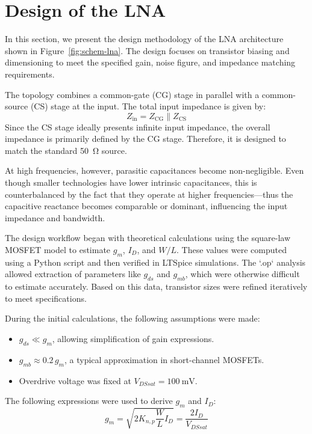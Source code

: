 \section{Design of the LNA}

In this section, we present the design methodology of the LNA architecture shown in Figure~\ref{fig:schem-lna}. The design focuses on transistor biasing and dimensioning to meet the specified gain, noise figure, and impedance matching requirements.

The topology combines a common-gate (CG) stage in parallel with a common-source (CS) stage at the input. The total input impedance is given by:
\[
Z_\text{in} = Z_\text{CG} \parallel Z_\text{CS}
\]
Since the CS stage ideally presents infinite input impedance, the overall impedance is primarily defined by the CG stage. Therefore, it is designed to match the standard \SI{50}{\ohm} source.

\label{sec:inpCap}
At high frequencies, however, parasitic capacitances become non-negligible. Even though smaller technologies have lower intrinsic capacitances, this is counterbalanced by the fact that they operate at higher frequencies—thus the capacitive reactance becomes comparable or dominant, influencing the input impedance and bandwidth.

The design workflow began with theoretical calculations using the square-law MOSFET model to estimate $g_m$, $I_D$, and $W/L$. These values were computed using a Python script and then verified in LTSpice simulations. The `.op` analysis allowed extraction of parameters like $g_{ds}$ and $g_{mb}$, which were otherwise difficult to estimate accurately. Based on this data, transistor sizes were refined iteratively to meet specifications.

\label{sec:assumptions}
During the initial calculations, the following assumptions were made:
\begin{itemize}
    \item $g_{ds} \ll g_m$, allowing simplification of gain expressions.
    \item $g_{mb} \approx 0.2\,g_m$, a typical approximation in short-channel MOSFETs.
    \item Overdrive voltage was fixed at $V_{DSsat} = \SI{100}{\milli\volt}$.
\end{itemize}

The following expressions were used to derive $g_m$ and $I_D$:
\begin{equation}
    g_m = \sqrt{2K_{n,p}\frac{W}{L}I_D} = \frac{2I_D}{V_{DSsat}} 
    \label{eq:gm_eq}
\end{equation}

